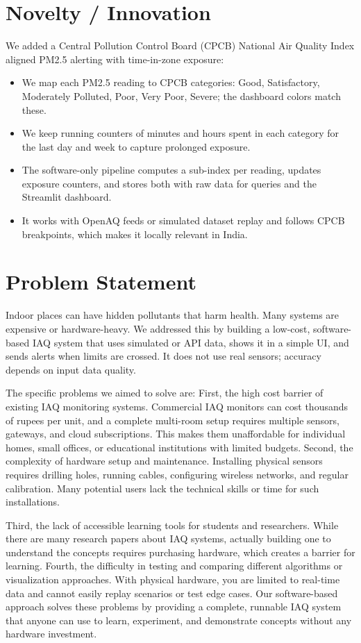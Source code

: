 \documentclass[12pt]{report}
\begin{document}
\section{Novelty / Innovation}
We added a Central Pollution Control Board (CPCB) National Air Quality Index aligned PM2.5 alerting with time-in-zone exposure:
\begin{itemize}
  \item We map each PM2.5 reading to CPCB categories: Good, Satisfactory, Moderately Polluted, Poor, Very Poor, Severe; the dashboard colors match these.
  \item We keep running counters of minutes and hours spent in each category for the last day and week to capture prolonged exposure.
  \item The software-only pipeline computes a sub-index per reading, updates exposure counters, and stores both with raw data for queries and the Streamlit dashboard.
  \item It works with OpenAQ feeds or simulated dataset replay and follows CPCB breakpoints, which makes it locally relevant in India.
\end{itemize}

\section{Problem Statement}
Indoor places can have hidden pollutants that harm health. Many systems are expensive or hardware-heavy. We addressed this by building a low-cost, software-based IAQ system that uses simulated or API data, shows it in a simple UI, and sends alerts when limits are crossed. It does not use real sensors; accuracy depends on input data quality.

The specific problems we aimed to solve are: First, the high cost barrier of existing IAQ monitoring systems. Commercial IAQ monitors can cost thousands of rupees per unit, and a complete multi-room setup requires multiple sensors, gateways, and cloud subscriptions. This makes them unaffordable for individual homes, small offices, or educational institutions with limited budgets. Second, the complexity of hardware setup and maintenance. Installing physical sensors requires drilling holes, running cables, configuring wireless networks, and regular calibration. Many potential users lack the technical skills or time for such installations.

Third, the lack of accessible learning tools for students and researchers. While there are many research papers about IAQ systems, actually building one to understand the concepts requires purchasing hardware, which creates a barrier for learning. Fourth, the difficulty in testing and comparing different algorithms or visualization approaches. With physical hardware, you are limited to real-time data and cannot easily replay scenarios or test edge cases. Our software-based approach solves these problems by providing a complete, runnable IAQ system that anyone can use to learn, experiment, and demonstrate concepts without any hardware investment.
\end{document}
